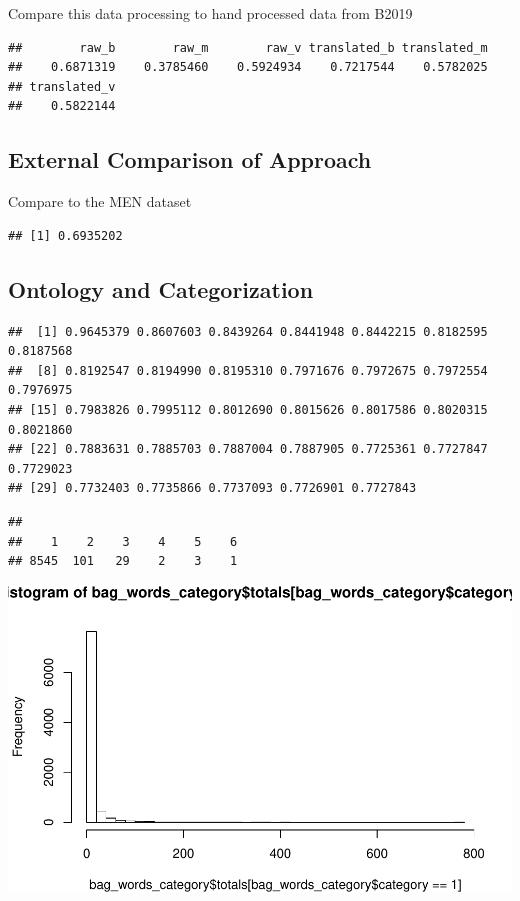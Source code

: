 \documentclass[man]{apa6}
\begin{document}
Compare this data processing to hand processed data from B2019

\begin{verbatim}
##        raw_b        raw_m        raw_v translated_b translated_m 
##    0.6871319    0.3785460    0.5924934    0.7217544    0.5782025 
## translated_v 
##    0.5822144
\end{verbatim}

\hypertarget{external-comparison-of-approach}{%
\subsection{External Comparison of Approach}\label{external-comparison-of-approach}}

Compare to the MEN dataset

\begin{verbatim}
## [1] 0.6935202
\end{verbatim}

\hypertarget{ontology-and-categorization}{%
\subsection{Ontology and Categorization}\label{ontology-and-categorization}}

\begin{verbatim}
##  [1] 0.9645379 0.8607603 0.8439264 0.8441948 0.8442215 0.8182595 0.8187568
##  [8] 0.8192547 0.8194990 0.8195310 0.7971676 0.7972675 0.7972554 0.7976975
## [15] 0.7983826 0.7995112 0.8012690 0.8015626 0.8017586 0.8020315 0.8021860
## [22] 0.7883631 0.7885703 0.7887004 0.7887905 0.7725361 0.7727847 0.7729023
## [29] 0.7732403 0.7735866 0.7737093 0.7726901 0.7727843
\end{verbatim}

\begin{verbatim}
## 
##    1    2    3    4    5    6 
## 8545  101   29    2    3    1
\end{verbatim}

\includegraphics{flt_manuscript_files/figure-latex/categorization-1.pdf}
\end{document}
